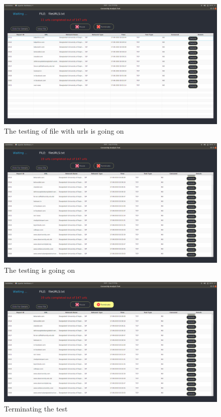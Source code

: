 \begin{figure}[h]
    \centering
    \includegraphics[width=\textwidth]{usersite/29filerunning.png}
    \caption{The testing of file with urls is going on}
    \label{fig:user29}
\end{figure}

\begin{figure}[h]
    \centering
    \includegraphics[width=\textwidth]{usersite/30filewaiting.png}
    \caption{The testing is going on}
    \label{fig:user30}
\end{figure}

\begin{figure}[h]
    \centering
    \includegraphics[width=\textwidth]{usersite/31filewaiting2.png}
    \caption{Terminating the test}
    \label{fig:user31}
\end{figure}

